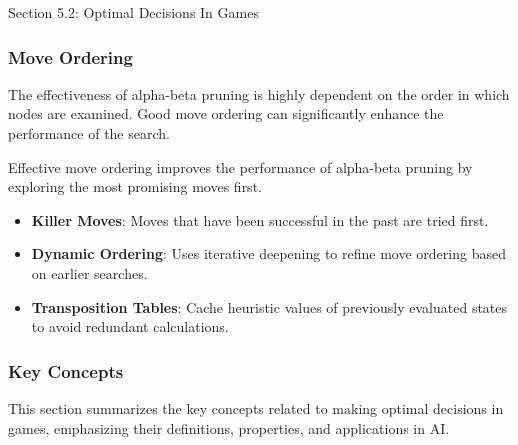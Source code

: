 \begin{notes}{Section 5.2: Optimal Decisions In Games}
    \subsubsection*{Move Ordering}
    
    The effectiveness of alpha-beta pruning is highly dependent on the order in which nodes are examined. Good move ordering can significantly enhance the performance of the search.
    
    \begin{highlight}
        Effective move ordering improves the performance of alpha-beta pruning by exploring the most promising moves first.
        
        \begin{itemize}
            \item \textbf{Killer Moves}: Moves that have been successful in the past are tried first.
            \item \textbf{Dynamic Ordering}: Uses iterative deepening to refine move ordering based on earlier searches.
            \item \textbf{Transposition Tables}: Cache heuristic values of previously evaluated states to avoid redundant calculations.
        \end{itemize}
    \end{highlight}
    
    \subsubsection*{Key Concepts}
    
    \begin{highlight}
        This section summarizes the key concepts related to making optimal decisions in games, emphasizing their definitions, properties, and applications in AI.
        

\end{highlight}
\end{notes}
